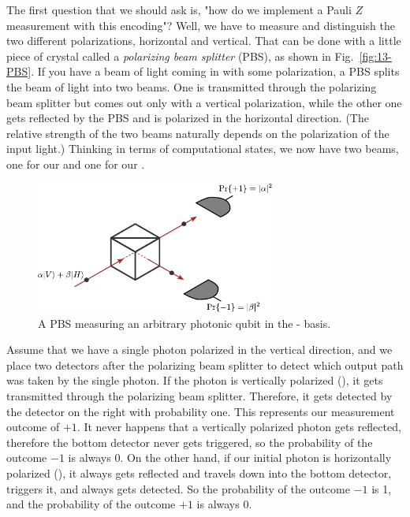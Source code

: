 The first question that we should ask is, "how do we implement a Pauli $Z$ measurement with this encoding"? Well, we have to measure and distinguish the two different polarizations, horizontal and vertical. That can be done with a little piece of crystal called a \emph{polarizing beam splitter} (PBS), as shown in Fig.~\ref{fig:13-PBS}. If you have a beam of light coming in with some polarization, a PBS splits the beam of light into two beams. One is transmitted through the polarizing beam splitter but comes out only with a vertical polarization, while the other one gets reflected by the PBS and is polarized in the horizontal direction. (The relative strength of the two beams naturally depends on the polarization of the input light.) Thinking in terms of computational states, we now have two beams, one for our  and one for our .  

\begin{figure}[t]
    \centering
    \includegraphics[width=0.7\textwidth]{lesson13/13-2_PBS_measure.pdf}
    \caption[A polarizing beam splitter (PBS) measuring a qubit]{A PBS measuring an arbitrary photonic qubit in the - basis.}
    \label{fig:13-PBS-measure}
\end{figure}

Assume that we have a single photon polarized in the vertical direction, and we place two detectors after the polarizing beam splitter to detect which output path was taken by the single photon. If the photon is vertically polarized (), it gets transmitted through the polarizing beam splitter. Therefore, it gets detected by the detector on the right with probability one. This represents our measurement outcome of $+1$. It never happens that a vertically polarized photon gets reflected, therefore the bottom detector never gets triggered, so the probability of the outcome $-1$ is always 0. On the other hand, if our initial photon is horizontally polarized (), it always gets reflected and travels down into the bottom detector, triggers it, and always gets detected. So the probability of the outcome $-1$ is 1, and the probability of the outcome $+1$ is always 0.

